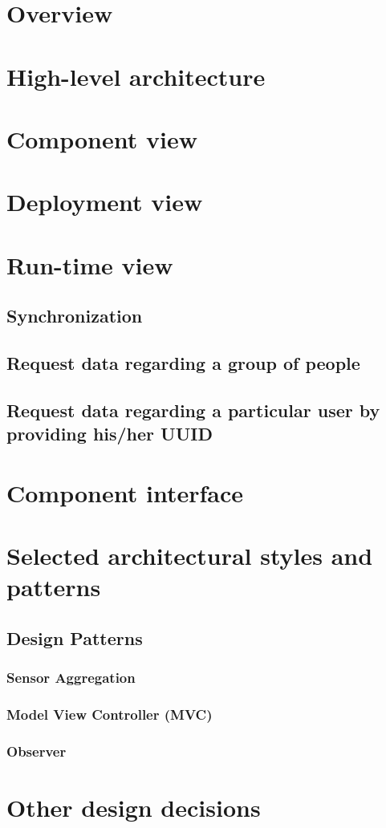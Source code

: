     \section{Overview}
    \section{High-level architecture}
    \section{Component view}
    \section{Deployment view}
    \section{Run-time view}
        \subsection{Synchronization}
        \subsection{Request data regarding a group of people}
        \subsection{Request data regarding a particular user by providing his/her UUID}
    \section{Component interface}
    \section{Selected architectural styles and patterns}    
        \subsection{Design Patterns}
            \subsubsection*{Sensor Aggregation} 
            \subsubsection*{Model View Controller (MVC)}
            \subsubsection*{Observer}
    \section{Other design decisions}